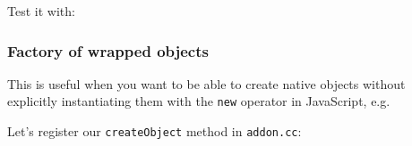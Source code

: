 Test it with:

\begin{Shaded}
\begin{Highlighting}[]
 \NormalTok{);}

  \NormalTok{(}\NormalTok{);}
\NormalTok{( }\NormalTok{() ); }
\NormalTok{( }\NormalTok{() ); }
\NormalTok{( }\NormalTok{() ); }
\end{Highlighting}
\end{Shaded}

\subsubsection{Factory of wrapped objects}

This is useful when you want to be able to create native objects without
explicitly instantiating them with the \texttt{new} operator in
JavaScript, e.g.

\begin{Shaded}
\begin{Highlighting}[]
 \NormalTok{();}
\end{Highlighting}
\end{Shaded}

Let's register our \texttt{createObject} method in \texttt{addon.cc}:

